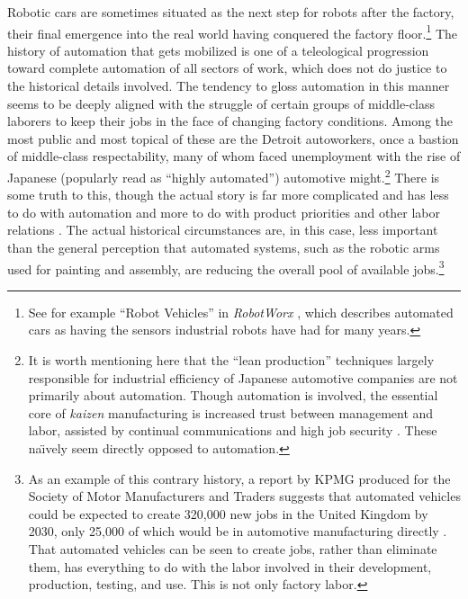 Robotic cars are sometimes situated as
the next step for robots after the factory, their final emergence into
the real world having conquered the factory floor.\footnote{See for
  example ``Robot Vehicles'' in \emph{RobotWorx} \cite{robotworx}, which describes automated cars as having the sensors
  industrial robots have had for many years.} The history of
automation that gets mobilized is one of a teleological progression
toward complete automation of all sectors of work, which does not do
justice to the historical details involved. The tendency to gloss
automation in this manner seems
to be deeply aligned with the struggle of certain groups of
middle-class laborers to keep their jobs in the face of changing
factory conditions. Among the most public and most topical of these
are the Detroit autoworkers, once a bastion of middle-class
respectability, many of whom faced unemployment with the rise of
Japanese (popularly read as ``highly automated'') automotive
might.\footnote{It is worth mentioning here that the ``lean
  production'' techniques largely responsible for industrial
  efficiency of Japanese automotive companies are not primarily about
  automation. Though automation is involved, the essential core of
  \emph{kaizen} manufacturing is increased trust between management
  and labor, assisted by continual communications and high job
  security \cite[p. 198--199]{nyeAmericas}. These na\"{\i}vely seem
  directly opposed to automation.} There is some truth to this, though
the actual story 
is far more complicated and has less to do with automation and more to
do with product priorities and other labor
relations \cite[p. 188--200]{nyeAmericas}. The actual historical
circumstances are, in this case, less important than the general
perception that automated 
systems, such as the robotic arms used for painting and assembly, are
reducing the overall pool of available jobs.\footnote{As an example of
  this contrary history, a report by KPMG produced for the Society of Motor
Manufacturers and Traders suggests that automated vehicles could be
expected to create 320,000 new jobs in the United Kingdom by 2030, only 25,000 of
which would be in automotive manufacturing directly
\cite{toveyCreate}.
That automated vehicles can be seen to create jobs, rather than
eliminate them, has everything to do with the labor involved in their
development, production, testing, and use. This is not only
factory labor.}


